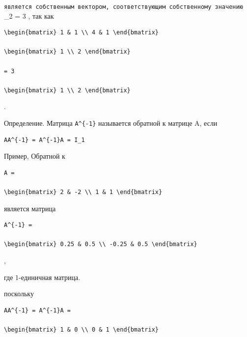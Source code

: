 \documentclass[
  ukrainian,
]{article}
\begin{document}
\texttt{является\ собственным\ вектором,\ соответствующим\ собственному\ значению}
\lambda\_2 = 3 , так как

\begin{verbatim}
\begin{bmatrix} 1 & 1 \\ 4 & 1 \end{bmatrix}

\begin{bmatrix} 1 \\ 2 \end{bmatrix}

= 3

\begin{bmatrix} 1 \\ 2 \end{bmatrix}
\end{verbatim}

.

Определение. Матрица \texttt{A\^{}\{-1\}} называется обратной к матрице
A, если

\begin{verbatim}
AA^{-1} = A^{-1}A = I_1
\end{verbatim}

Пример, Обратной к

\begin{verbatim}
A =

\begin{bmatrix} 2 & -2 \\ 1 & 1 \end{bmatrix}
\end{verbatim}

является матрица

\begin{verbatim}
A^{-1} =

\begin{bmatrix} 0.25 & 0.5 \\ -0.25 & 0.5 \end{bmatrix}
\end{verbatim}

,

где 1-единичная матрица.

поскольку

\begin{verbatim}
AA^{-1} = A^{-1}A =

\begin{bmatrix} 1 & 0 \\ 0 & 1 \end{bmatrix}
\end{verbatim}
\end{document}
